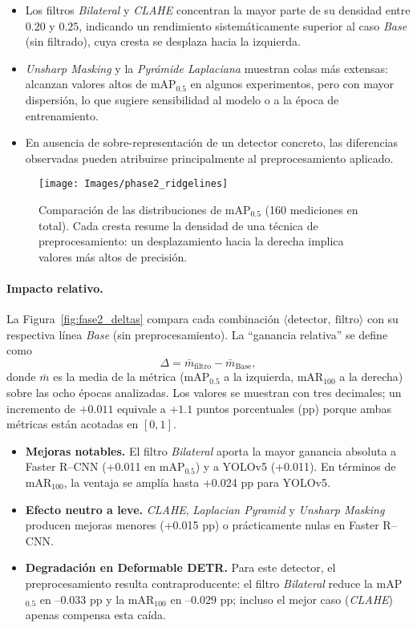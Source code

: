 \begin{itemize}
  \item Los filtros \textit{Bilateral} y \textit{CLAHE} concentran la mayor parte de su densidad entre \(0.20\) y \(0.25\), indicando un rendimiento sistemáticamente superior al caso \textit{Base} (sin filtrado), cuya cresta se desplaza hacia la izquierda.
  \item \textit{Unsharp Masking} y la \textit{Pyrámide Laplaciana} muestran colas más extensas: alcanzan valores altos de mAP\(_{0.5}\) en algunos experimentos, pero con mayor dispersión, lo que sugiere sensibilidad al modelo o a la época de entrenamiento.
  \item En ausencia de sobre-representación de un detector concreto, las diferencias observadas pueden atribuirse principalmente al preprocesamiento aplicado.
\end{itemize}

\begin{figure}[htpb]
  \centering
  \texttt{[image: Images/phase2\_ridgelines]}
  \caption[Distribución de mAP\(_{0.5}\) por técnica]{Comparación de las distribuciones de mAP\(_{0.5}\) (160 mediciones en total).
           Cada cresta resume la densidad de una técnica de preprocesamiento: un desplazamiento hacia la derecha implica valores más altos de precisión.}
  \label{fig:fase2_ridges}
\end{figure}

\paragraph{Impacto relativo.}
La Figura~\ref{fig:fase2_deltas} compara cada combinación \(\langle\text{detector},\ \text{filtro}\rangle\) con su respectiva línea \textit{Base} (sin preprocesamiento).
La “ganancia relativa” se define como
\[
  \Delta = \bar{m}_{\text{filtro}} - \bar{m}_{\text{Base}},
\]
donde \(\bar{m}\) es la media de la métrica (mAP\(_{0.5}\) a la izquierda, mAR\(_{100}\) a la derecha) sobre las ocho épocas analizadas.
Los valores se muestran con tres decimales; un incremento de \(+0.011\) equivale a \(+1.1\) puntos porcentuales (pp) porque ambas métricas están acotadas en \([0,1]\).

\begin{itemize}
  \item \textbf{Mejoras notables.}
        El filtro \emph{Bilateral} aporta la mayor ganancia absoluta a Faster R–CNN (+0.011 en mAP\(_{0.5}\)) y a YOLOv5 (+0.011).
        En términos de mAR\(_{100}\), la ventaja se amplía hasta +0.024 pp para YOLOv5.
  \item \textbf{Efecto neutro a leve.}
        \emph{CLAHE}, \emph{Laplacian Pyramid} y \emph{Unsharp Masking} producen mejoras menores (+0.015 pp) o prácticamente nulas en Faster R–CNN.
  \item \textbf{Degradación en Deformable DETR.}
        Para este detector, el preprocesamiento resulta contraproducente: el filtro \emph{Bilateral} reduce la mAP\(_{0.5}\) en –0.033 pp y la mAR\(_{100}\) en –0.029 pp; incluso el mejor caso (\emph{CLAHE}) apenas compensa esta caída.
\end{itemize}

